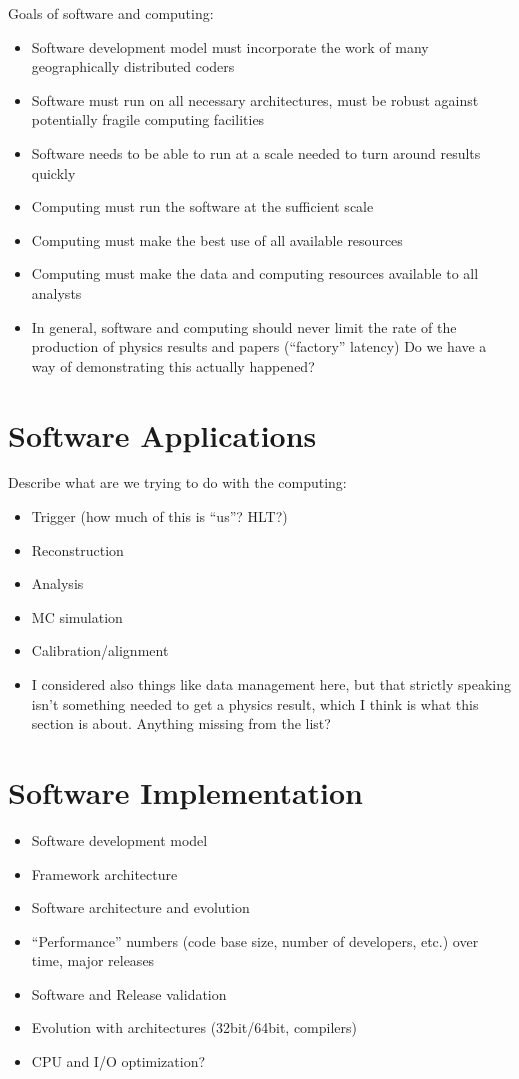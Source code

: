 \documentclass [draft,notitlepage] {article}
\begin{document}
Goals of software and computing:

\begin{itemize}
\item Software development model must incorporate the work of many geographically distributed coders
\item Software must run on all necessary architectures, must be robust against potentially fragile computing facilities
\item Software needs to be able to run at a scale needed to turn around results quickly
\item Computing must run the software at the sufficient scale
\item Computing must make the best use of all available resources
\item Computing must make the data and computing resources available to all analysts
\item In general, software and computing should never limit the rate of the production of physics results and papers (``factory'' latency) Do we have a way of demonstrating this actually happened?
\end{itemize}


\section{Software Applications} 
Describe what are we trying to do with the computing:
\begin{itemize}
\item Trigger (how much of this is ``us''?  HLT?)
\item Reconstruction
\item Analysis
\item MC simulation
\item Calibration/alignment
\item I considered also things like data management here, but that strictly speaking isn't something needed to get a physics result, which I think is what this section is about.  Anything missing from the list?
\end{itemize}


\section{Software Implementation}
\begin{itemize}
\item Software development model
\item Framework architecture 
\item Software architecture and evolution
\item ``Performance'' numbers (code base size, number of developers, etc.) 
over time, major releases
\item Software and Release validation
\item Evolution with architectures (32bit/64bit, compilers)
\item CPU and I/O optimization?
\end{itemize}
\end{document}
